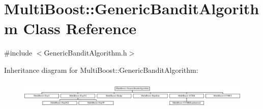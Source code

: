 \hypertarget{classMultiBoost_1_1GenericBanditAlgorithm}{\section{Multi\-Boost\-:\-:Generic\-Bandit\-Algorithm Class Reference}
\label{classMultiBoost_1_1GenericBanditAlgorithm}
}


{\ttfamily \#include $<$Generic\-Bandit\-Algorithm.\-h$>$}

Inheritance diagram for Multi\-Boost\-:\-:Generic\-Bandit\-Algorithm\-:\begin{figure}[H]
\begin{center}
\leavevmode
\includegraphics[height=1.290323cm]{classMultiBoost_1_1GenericBanditAlgorithm}
\end{center}
\end{figure}
